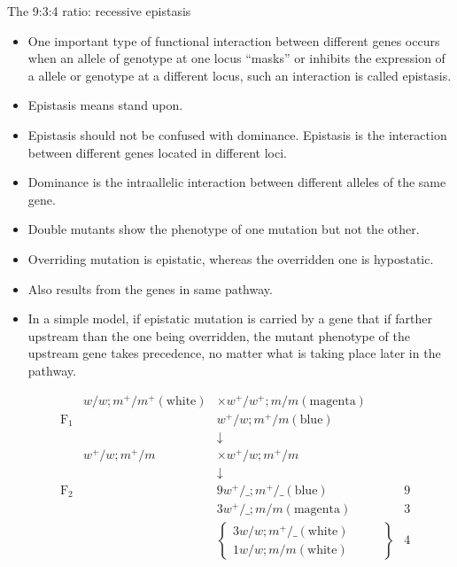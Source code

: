 \documentclass[11pt,dvipsnames,ignorenonframetext,aspectratio=169]{beamer}
\providecommand{\tightlist}{%
  \setlength{\itemsep}{0pt}\setlength{\parskip}{0pt}}
\begin{document}
\begin{frame}{The 9:3:4 ratio: recessive epistasis}
\protect\hypertarget{the-934-ratio-recessive-epistasis}{}
\begin{itemize}
\tightlist
\item
  One important type of functional interaction between different genes
  occurs when an allele of genotype at one locus ``masks'' or inhibits
  the expression of a allele or genotype at a different locus, such an
  interaction is called epistasis.
\item
  Epistasis means stand upon.
\item
  Epistasis should not be confused with dominance. Epistasis is the
  interaction between different genes located in different loci.
\item
  Dominance is the intraallelic interaction between different alleles of
  the same gene.
\item
  Double mutants show the phenotype of one mutation but not the other.
\item
  Overriding mutation is epistatic, whereas the overridden one is
  hypostatic.
\item
  Also results from the genes in same pathway.
\item
  In a simple model, if epistatic mutation is carried by a gene that if
  farther upstream than the one being overridden, the mutant phenotype
  of the upstream gene takes precedence, no matter what is taking place
  later in the pathway.
\end{itemize}
\end{frame}

\begin{frame}{}
\protect\hypertarget{section-18}{}
\[
\begin{aligned}
& & w/w; m^+/m^+ (\text{white}) & \times w^+/w^+; m/m (\text{magenta}) &\\
& \mathrm{F_1} & & w^+/w; m^+/m (\text{blue}) & \\
& & & \downarrow & \\
& & w^+/w; m^+/m &\times w^+/w; m^+/m & \\
& & & \downarrow & \\
& \mathrm{F_2} & & 9w^+/\_; m^+/\_ (\text{blue}) \hspace{1cm} & 9 \\
& & & 3 w^+/\_; m/m (\text{magenta}) \hspace{1cm} & 3 \\
& & & \left\{
\begin{array}{ll}
3 w/w; m^+/\_ (\text{white}) \hspace{1cm} \\
1 w/w; m/m (\text{white})
\end{array}
\right\} & 4
\end{aligned}
\]
\end{frame}
\end{document}
